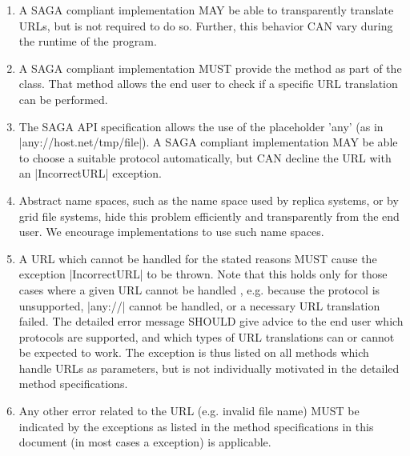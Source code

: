   \begin{enumerate}

   \item A SAGA compliant implementation MAY be able to
   transparently translate URLs, but is not required to do so.
   Further, this behavior CAN vary during the runtime of the
   program.

   \item A SAGA compliant implementation MUST provide
   the  method as part of the  class.
   That method allows the end user to check if a specific URL
   translation can be performed.

   \item The SAGA API specification allows the use of the
   placeholder 'any' (as in |any://host.net/tmp/file|).  A SAGA
   compliant implementation MAY be able to choose a suitable
   protocol automatically, but CAN decline the URL with an
   |IncorrectURL| exception.

   \item Abstract name spaces, such as the name space used by
   replica systems, or by grid file systems, hide this problem
   efficiently and transparently from the end user.  We
   encourage implementations to use such name spaces.

   \item A URL which cannot be handled for the stated reasons
   MUST cause the exception |IncorrectURL| to be thrown.  Note
   that this holds only for those cases where a given URL cannot
   be handled , e.g. because the protocol is
   unsupported, |any://| cannot be handled, or a necessary URL
   translation failed.  The detailed error message SHOULD give
   advice to the end user which protocols are supported, and
   which types of URL translations can or cannot be expected to
   work.  The  exception is thus listed on
   all methods which handle URLs as parameters, but is not
   individually motivated in the detailed method
   specifications.

   \item Any other error related to the URL (e.g. invalid file name) MUST be
   indicated by the exceptions as listed in the method
   specifications in this document  (in most cases a
    exception) is applicable.  

  \end{enumerate}

